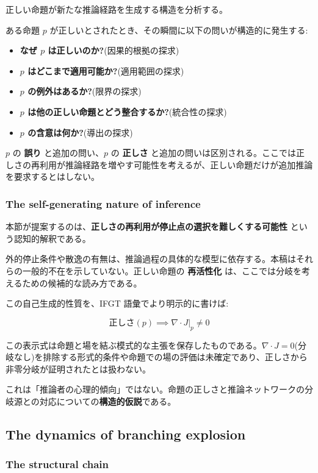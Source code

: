 正しい命題が新たな推論経路を生成する構造を分析する。

ある命題 $p$ が正しいとされたとき、その瞬間に以下の問いが構造的に発生する:

\begin{itemize}
\item \textbf{なぜ $p$ は正しいのか?}(因果的根拠の探求)
\item \textbf{$p$ はどこまで適用可能か?}(適用範囲の探求)
\item \textbf{$p$ の例外はあるか?}(限界の探求)
\item \textbf{$p$ は他の正しい命題とどう整合するか?}(統合性の探求)
\item \textbf{$p$ の含意は何か?}(導出の探求)
\end{itemize}

$p$ の \textbf{誤り} と追加の問い、$p$ の \textbf{正しさ} と追加の問いは区別される。ここでは正しさの再利用が推論経路を増やす可能性を考えるが、正しい命題だけが追加推論を要求するとはしない。

\subsubsection{The self-generating nature of inference}


本節が提案するのは、\textbf{正しさの再利用が停止点の選択を難しくする可能性} という認知的解釈である。

外的停止条件や散逸の有無は、推論過程の具体的な模型に依存する。本稿はそれらの一般的不在を示していない。正しい命題の \textbf{再活性化} は、ここでは分岐を考えるための候補的な読み方である。

この自己生成的性質を、IFGT 語彙でより明示的に書けば:

\[
\text{正しさ}(p) \implies \nabla \cdot J|_p \neq 0
\]

この表示式は命題と場を結ぶ模式的な主張を保存したものである。$\nabla \cdot J = 0$(分岐なし)を排除する形式的条件や命題での場の評価は未確定であり、正しさから非零分岐が証明されたとは扱わない。

これは「推論者の心理的傾向」ではない。命題の正しさと推論ネットワークの分岐源との対応についての\textbf{構造的仮説}である。

\subsection{The dynamics of branching explosion}


\subsubsection{The structural chain}


